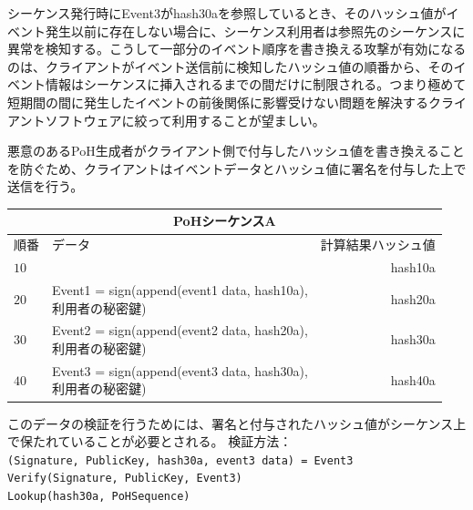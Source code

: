 \documentclass[12pt]{ltjsarticle}
\begin{document}
シーケンス発行時にEvent3がhash30aを参照しているとき、そのハッシュ値がイベント発生以前に存在しない場合に、シーケンス利用者は参照先のシーケンスに異常を検知する。こうして一部分のイベント順序を書き換える攻撃が有効になるのは、クライアントがイベント送信前に検知したハッシュ値の順番から、そのイベント情報はシーケンスに挿入されるまでの間だけに制限される。つまり極めて短期間の間に発生したイベントの前後関係に影響受けない問題を解決するクライアントソフトウェアに絞って利用することが望ましい。

悪意のあるPoH生成者がクライアント側で付与したハッシュ値を書き換えることを防ぐため、クライアントはイベントデータとハッシュ値に署名を付与した上で送信を行う。\\
\begin{center}
  \begin{tabular}{  l  l  r }
    \multicolumn{3}{c}{PoHシーケンスA} \\
    \hline
    順番  & データ & 計算結果ハッシュ値 \\ \hline
    $10$ & & hash10a  \\ 
    $20$ & \makecell{Event1 = sign(append(event1 data, hash10a), \\利用者の秘密鍵)} & hash20a\\ 
    $30$ & \makecell{Event2 = sign(append(event2 data, hash20a), \\利用者の秘密鍵)} & hash30a \\ 
    $40$ & \makecell{Event3 = sign(append(event3 data, hash30a), \\利用者の秘密鍵)} & hash40a \\

    \end{tabular}
\end{center}

このデータの検証を行うためには、署名と付与されたハッシュ値がシーケンス上で保たれていることが必要とされる。\newpage
\noindent 検証方法：\\

\noindent\texttt{(Signature, PublicKey, hash30a, event3 data) = Event3} \\
\texttt{Verify(Signature, PublicKey, Event3)}\\
\texttt{Lookup(hash30a, PoHSequence)}\\
\end{document}
